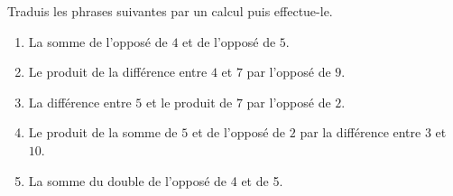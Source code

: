 %
%
    Traduis les phrases suivantes par un calcul puis effectue-le.
    \begin{enumerate}[itemsep=.3cm]
        \item La somme de l'opposé de \(4\) et de l'opposé de \(5\).
        \item Le produit de la différence entre \(4\) et \(7\) par l'opposé de \(9\).
        \item La différence entre \(5\) et le produit de \(7\) par l'opposé de \(2\).
        \item Le produit de la somme de \(5\) et de l'opposé de \(2\) par la différence entre \(3\) et \(10.\)
        \item La somme du double de l'opposé de 4 et de 5.
    \end{enumerate}
